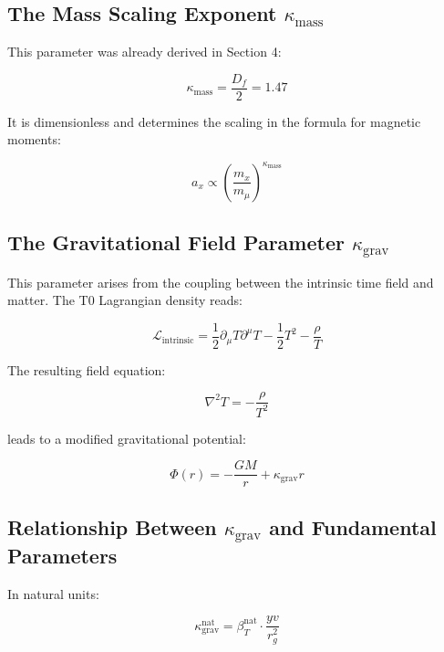 \documentclass[12pt,a4paper]{report}
\begin{document}
	\subsection{The Mass Scaling Exponent $\kappa_{\text{mass}}$}
	
	This parameter was already derived in Section 4:
	
	\begin{equation}
		\kappa_{\text{mass}} = \frac{D_f}{2} = 1.47
	\end{equation}
	
	It is dimensionless and determines the scaling in the formula for magnetic moments:
	
	\begin{equation}
		a_x \propto \left(\frac{m_x}{m_\mu}\right)^{\kappa_{\text{mass}}}
	\end{equation}
	
	\subsection{The Gravitational Field Parameter $\kappa_{\text{grav}}$}
	
	This parameter arises from the coupling between the intrinsic time field and matter. The T0 Lagrangian density reads:
	
	\begin{equation}
		\mathcal{L}_{\text{intrinsic}} = \frac{1}{2}\partial_\mu T \partial^\mu T - \frac{1}{2}T^2 - \frac{\rho}{T}
	\end{equation}
	
	The resulting field equation:
	
	\begin{equation}
		\nabla^2 T = -\frac{\rho}{T^2}
	\end{equation}
	
	leads to a modified gravitational potential:
	
	\begin{equation}
		\Phi(r) = -\frac{GM}{r} + \kappa_{\text{grav}} r
	\end{equation}
	
	\subsection{Relationship Between $\kappa_{\text{grav}}$ and Fundamental Parameters}
	
	In natural units:
	
	\begin{equation}
		\kappa_{\text{grav}}^{\text{nat}} = \beta_T^{\text{nat}} \cdot \frac{yv}{r_g^2}
	\end{equation}
	
\end{document}
